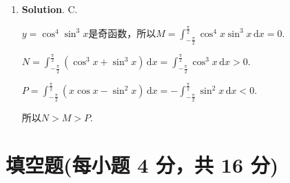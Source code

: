 \documentclass[../main.tex]{subfiles}
\begin{document}
\begin{enumerate}
    \item \textbf{Solution}. C.

          $y=\cos^{4}\sin^{3} x$是奇函数，所以$M=\int_{-\frac{\pi}{2}}^{\frac{\pi}{2}}
              \cos^{4} x\sin^{3} x\,\mathrm{d}x=0$.

          $N=\int_{-\frac{\pi}{2}}^{\frac{\pi}{2}}\left(\cos^{3} x+\sin^{3} x\right)\,\mathrm{d}
              x=\int_{-\frac{\pi}{2}}^{\frac{\pi}{2}}\cos^{3} x\,\mathrm{d}x>0$.

          $P=\int_{-\frac{\pi}{2}}^{\frac{\pi}{2}}\left(x\cos x-\sin^{2} x\right)\,\mathrm{d}
              x=-\int_{-\frac{\pi}{2}}^{\frac{\pi}{2}}\sin^{2} x\,\mathrm{d}x<0$.

          所以$N>M>P$.
\end{enumerate}

\section{填空题(每小题 4 分，共 16 分)}
\end{document}
